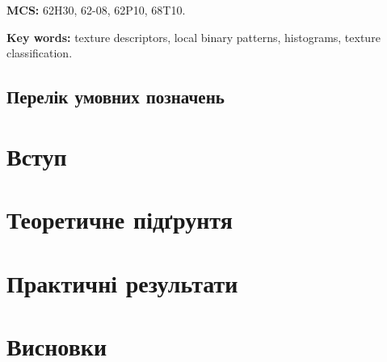 \documentclass{thesis}
\newcommand{\MSCEn}{62H30, 62-08, 62P10, 68T10.}
\newcommand{\1}{\mathbb 1}
\begin{document}
\bigskip

\noindent
{\bf MCS:} \MSCEn %


\bigskip

\noindent
{\bf Key words:} texture descriptors, local binary patterns, histograms, texture classification.


\newpage


\tableofcontents

\newpage

\section*{Перелік умовних позначень}


\newpage

\chapter*{Вступ}\label{Introduction}


\newpage

\chapter{Теоретичне підґрунтя}\label{chapter1}







\newpage

\chapter{Практичні результати}\label{chapter2}





\newpage

\chapter*{Висновки}
\end{document}

